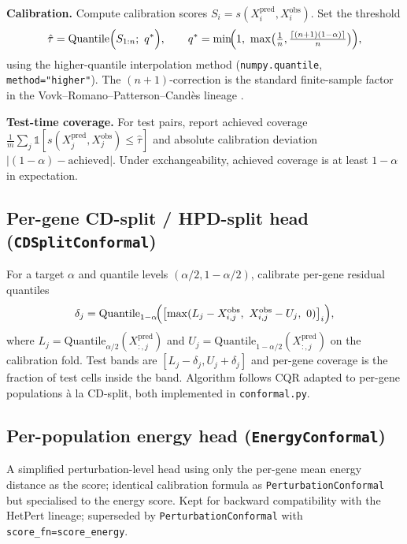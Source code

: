 \documentclass{article}
\begin{document}
\textbf{Calibration.} Compute calibration scores $S_i = s(X^{\text{pred}}_i, X^{\text{obs}}_i)$. Set the threshold
\begin{equation}
\hat{\tau} = \mathrm{Quantile}\Bigl(S_{1:n};\ q^*\Bigr), \qquad q^* = \min\!\Bigl(1,\ \max\bigl(\tfrac{1}{n}, \tfrac{\lceil (n+1)(1-\alpha)\rceil}{n}\bigr)\Bigr),
\end{equation}
using the higher-quantile interpolation method (\texttt{numpy.quantile}, \texttt{method="higher"}). The $(n+1)$-correction is the standard finite-sample factor in the Vovk--Romano--Patterson--Cand\`es lineage \citep{romano2019}.

\textbf{Test-time coverage.} For test pairs, report achieved coverage $\frac{1}{m}\sum_{j} \mathbb{1}[s(X^{\text{pred}}_j, X^{\text{obs}}_j) \leq \hat{\tau}]$ and absolute calibration deviation $|(1 - \alpha) - \mathrm{achieved}|$. Under exchangeability, achieved coverage is at least $1 - \alpha$ in expectation.

\subsection{Per-gene CD-split / HPD-split head (\texttt{CDSplitConformal})}
For a target $\alpha$ and quantile levels $(\alpha/2, 1 - \alpha/2)$, calibrate per-gene residual quantiles
\begin{equation}
\delta_j = \mathrm{Quantile}_{1-\alpha}\!\Bigl(\bigl[\max(L_j - X^{\text{obs}}_{i,j},\ X^{\text{obs}}_{i,j} - U_j,\ 0)\bigr]_{i}\Bigr),
\end{equation}
where $L_j = \mathrm{Quantile}_{\alpha/2}(X^{\text{pred}}_{:, j})$ and $U_j = \mathrm{Quantile}_{1-\alpha/2}(X^{\text{pred}}_{:, j})$ on the calibration fold. Test bands are $[L_j - \delta_j, U_j + \delta_j]$ and per-gene coverage is the fraction of test cells inside the band. Algorithm follows \citet{romano2019} CQR adapted to per-gene populations \`a la \citet{izbicki2022} CD-split, both implemented in \texttt{conformal.py}.

\subsection{Per-population energy head (\texttt{EnergyConformal})}
A simplified perturbation-level head using only the per-gene mean energy distance as the score; identical calibration formula as \texttt{PerturbationConformal} but specialised to the energy score. Kept for backward compatibility with the HetPert lineage; superseded by \texttt{PerturbationConformal} with \texttt{score\_fn=score\_energy}.
\end{document}
